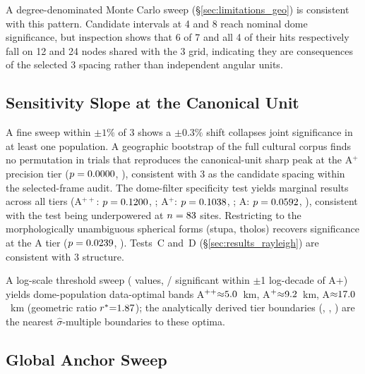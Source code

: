 A degree-denominated Monte Carlo sweep
(\S\ref{sec:limitations_geo}) is consistent with this pattern. Candidate intervals
at 4\textdegree{} and 8\textdegree{} reach nominal dome significance, but
inspection shows that 6 of 7 and all 4 of their hits respectively fall on
12\textdegree{} and 24\textdegree{} nodes shared with the 3\textdegree{}
grid, indicating they are consequences of the selected 3\textdegree{}
spacing rather than independent angular units.

\subsection{Sensitivity Slope at the Canonical Unit}
\label{sec:sensitivity_slope_perm}

A fine sweep within $\pm 1\%$ of 3\textdegree{}
shows a $\pm 0.3\%$ shift collapses joint significance in at least one
population. A geographic bootstrap of the full cultural corpus finds no
permutation in \permSlopeSpecN{} trials that reproduces the canonical-unit
sharp peak at the A$^{+}$ precision tier
($p = 0.0000{}$, \permSlopeCanonBestJointSigFullAP{}),
consistent with
3\textdegree{} as the candidate spacing within the selected-frame
audit. The dome-filter specificity test yields marginal results across all
tiers (A$^{++}$: $p = 0.1200{}$,
\permSlopeCanonBestJointSigDomeAPP{}; A$^{+}$: $p = 0.1038{}$,
\permSlopeCanonBestJointSigDomeAP{}; A: $p = 0.0592{}$,
\permSlopeCanonBestJointSigDomeA{}), consistent with the test being underpowered
at $n = 83{}$ sites. Restricting to the \permSlopeKwN{}
morphologically unambiguous spherical forms (stupa, tholos) recovers
significance at the A tier
($p = 0.0239{}$, \permSlopeCanonBestJointSigKwA{}). Tests~C and~D
(\S\ref{sec:results_rayleigh}) are consistent with 3\textdegree{} structure.

A log-scale threshold sweep (\logSweepNtaus{} values,
\logSweepAregionNsig/\logSweepAregionNtaus{} significant within $\pm$1
log-decade of A+) yields dome-population data-optimal bands
A$^{++}{\approx}5.0{}$~km,
A$^{+}{\approx}9.2{}$~km,
A${\approx}17.0{}$~km
(geometric ratio $r^{*}{=}1.87{}$);
the analytically derived tier boundaries (\AppThreshDeg{}\textdegree{}, \ApThreshDeg{}\textdegree{}, \ATierThreshDeg{}\textdegree{})
are the nearest $\hat{\sigma}$-multiple boundaries to these optima.

\subsection{Global Anchor Sweep}
\label{sec:sensitivity_global}

